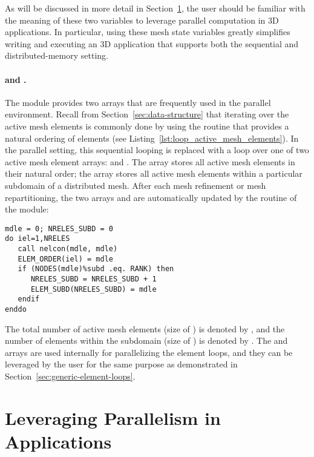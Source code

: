 As will be discussed in more detail in Section~\ref{sec:leveraging}, the user should be familiar with the meaning of these two variables to leverage parallel computation in \hp3D applications. In particular, using these mesh state variables greatly simplifies writing and executing an \hp3D application that supports both the sequential and distributed-memory setting.

\paragraph{ and .}
The  module provides two arrays that are frequently used in the parallel environment. Recall from Section~\ref{sec:data-structure} that iterating over the active mesh elements is commonly done by using the  routine that provides a natural ordering of elements (see Listing~\ref{lst:loop_active_mesh_elements}). In the parallel setting, this sequential looping is replaced with a loop over one of two active mesh element arrays:  and . The  array stores all active mesh elements in their natural order; the  array stores all active mesh elements within a particular subdomain of a distributed mesh. After each mesh refinement or mesh repartitioning, the two arrays  and  are automatically updated by the  routine of the  module:

\begin{lstlisting}[caption=Updating the data structure arrays \var{ELEM\_ORDER} and \var{ELEM\_SUBD}., label={lst:update_elem_order}]
mdle = 0; NRELES_SUBD = 0
do iel=1,NRELES
   call nelcon(mdle, mdle)
   ELEM_ORDER(iel) = mdle
   if (NODES(mdle)%subd .eq. RANK) then
      NRELES_SUBD = NRELES_SUBD + 1
      ELEM_SUBD(NRELES_SUBD) = mdle
   endif
enddo
\end{lstlisting}

The total number of active mesh elements (size of ) is denoted by , and the number of elements within the subdomain (size of ) is denoted by . The  and  arrays are used internally for parallelizing the element loops, and they can be leveraged by the user for the same purpose as demonstrated in Section~\ref{sec:generic-element-loops}.

\section{Leveraging Parallelism in Applications}
\label{sec:leveraging}


